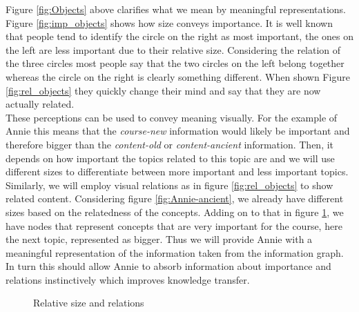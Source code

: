 \documentclass[twoside, 12pt]{article}
\begin{document}
Figure \ref{fig:Objects} above clarifies what we mean by meaningful representations. Figure \ref{fig:imp_objects} shows how size conveys importance. It is well known that people tend to identify the circle on the right as most important, the ones on the left are less important due to their relative size. Considering the relation of the three circles most people say that the two circles on the left belong together whereas the circle on the right is clearly something different. When shown Figure \ref{fig:rel_objects} they quickly change their mind and say that they are now actually related.\\

These perceptions can be used to convey meaning visually. For the example of Annie this means that the \textit{course-new} information would likely be important and therefore bigger than the \textit{content-old} or \textit{content-ancient} information. Then, it depends on how important the topics related to this topic are and we will use different sizes to differentiate between more important and less important topics. Similarly, we will employ visual relations as in figure \ref{fig:rel_objects} to show related content. Considering figure \ref{fig:Annie-ancient}, we already have different sizes based on the relatedness of the concepts. Adding on to that in figure \ref{fig:Annie-relsize}, we have nodes that represent concepts that are very important for the course, here the next topic, represented as bigger. Thus we will provide Annie with a meaningful representation of the information taken from the information graph. In turn this should allow Annie to absorb information about importance and relations instinctively which improves knowledge transfer.\\

\begin{figure}[H]
        \centering
  \caption{Relative size and relations} 
  \label{fig:Annie-relsize}
\end{figure}
\end{document}
